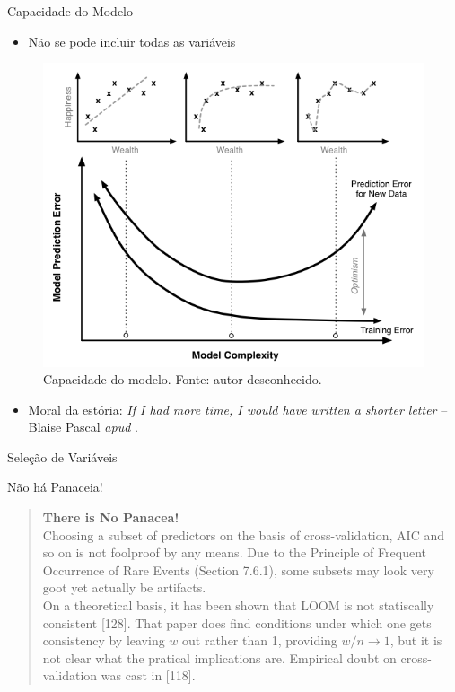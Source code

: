 \documentclass[9pt,ignorenonframetext,aspectratio=169]{beamer}
\providecommand{\tightlist}{%
  \setlength{\itemsep}{0pt}\setlength{\parskip}{0pt}}
\begin{document}
\begin{frame}{Capacidade do Modelo}
\protect\hypertarget{capacidade-do-modelo}{}

\begin{itemize}[<+->]
\tightlist
\item
  Não se pode incluir todas as variáveis
\end{itemize}

\begin{figure}

{\centering \includegraphics[width=0.4\linewidth]{../../images/model_complexity} 

}

\caption{Capacidade do modelo. Fonte: autor desconhecido.}\label{fig:unnamed-chunk-4}
\end{figure}

\begin{itemize}[<+->]
\tightlist
\item
  Moral da estória:
  \emph{If I had more time, I would have written a shorter
  letter} -- Blaise Pascal \emph{apud} \textcite{matloff2017}.
\end{itemize}

\end{frame}

\begin{frame}{Seleção de Variáveis}
\protect\hypertarget{seleuxe7uxe3o-de-variuxe1veis}{}

\begin{block}{Não há Panaceia!}

\begin{quote}
\textbf{There is No Panacea!}\\
Choosing a subset of predictors on the basis of cross-validation, AIC
and so on is not foolproof by any means. Due to the Principle of
Frequent Occurrence of Rare Events (Section 7.6.1), some subsets may
look very goot yet actually be artifacts.\\
On a theoretical basis, it has been shown that LOOM is not statiscally
consistent {[}128{]}. That paper does find conditions under which one
gets consistency by leaving \(w\) out rather than 1, providing
\(w/n \rightarrow 1\), but it is not clear what the pratical
implications are. Empirical doubt on cross-validation was cast in
{[}118{]}. \autocite[348]{matloff2017}
\end{quote}

\end{block}

\end{frame}
\end{document}
